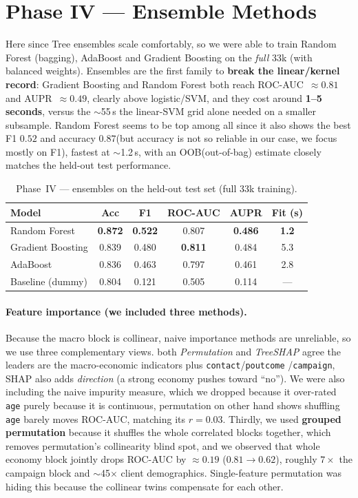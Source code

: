 \documentclass[11pt]{article}
\begin{document}
\section{Phase IV --- Ensemble Methods}
Here since Tree ensembles scale comfortably, so we were able to train Random Forest (bagging), AdaBoost and Gradient Boosting on the \emph{full} 33k (with balanced weights). Ensembles are the first family to \textbf{break the linear/kernel record}: Gradient Boosting and Random Forest both reach ROC-AUC~$\approx 0.81$ and AUPR~$\approx 0.49$, clearly above logistic/SVM, and they cost around \textbf{1--5 seconds}, versus the $\sim$55\,s the linear-SVM grid alone needed on a smaller subsample. Random Forest seems to be top among all since it also shows the best F1 $0.52$ and accuracy $0.87$(but accuracy is not so reliable in our case, we focus mostly on F1), fastest at $\sim$1.2\,s, with an OOB(out-of-bag) estimate closely matches the held-out test performance.

\begin{table}[H]
\centering\small
\caption{Phase~IV --- ensembles on the held-out test set (full 33k training).}\label{tab:ens}
\begin{tabular}{lccccc}
\toprule
Model & Acc & F1 & ROC-AUC & AUPR & Fit (s) \\
\midrule
Random Forest      & \textbf{0.872} & \textbf{0.522} & 0.807 & \textbf{0.486} & \textbf{1.2} \\
Gradient Boosting  & 0.839 & 0.480 & \textbf{0.811} & 0.484 & 5.3 \\
AdaBoost           & 0.836 & 0.463 & 0.797 & 0.461 & 2.8 \\
Baseline (dummy)   & 0.804 & 0.121 & 0.505 & 0.114 & --- \\
\bottomrule
\end{tabular}
\end{table}

\paragraph{Feature importance (we included three methods).} Because the macro block is collinear, naive importance methods are unreliable, so we use three complementary views. both \emph{Permutation} and \emph{TreeSHAP} agree the leaders are the macro-economic indicators plus \texttt{contact}/\texttt{poutcome}
/\texttt{campaign}, SHAP also adds \emph{direction} (a strong economy pushes toward ``no''). We were also including the naive impurity measure, which we dropped because it over-rated \texttt{age} purely because it is continuous, permutation on other hand shows shuffling \texttt{age} barely moves ROC-AUC, matching its $r=0.03$. Thirdly, we used \textbf{grouped permutation} because it shuffles the whole correlated blocks together, which removes permutation's collinearity blind spot, and we observed that whole economy block jointly drops ROC-AUC by $\approx 0.19$ ($0.81\!\rightarrow\!0.62$), roughly $7\times$ the campaign block and $\sim$45$\times$ client demographics. Single-feature permutation was hiding this because the collinear twins compensate for each other.
\end{document}
